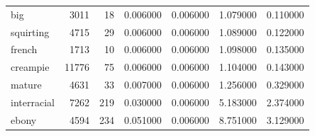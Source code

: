 \begin{tabular}{lrrrrrr}
big & 3011 & 18 & 0.006000 & 0.006000 & 1.079000 & 0.110000 \\
squirting & 4715 & 29 & 0.006000 & 0.006000 & 1.089000 & 0.122000 \\
french & 1713 & 10 & 0.006000 & 0.006000 & 1.098000 & 0.135000 \\
creampie & 11776 & 75 & 0.006000 & 0.006000 & 1.104000 & 0.143000 \\
mature & 4631 & 33 & 0.007000 & 0.006000 & 1.256000 & 0.329000 \\
interracial & 7262 & 219 & 0.030000 & 0.006000 & 5.183000 & 2.374000 \\
ebony & 4594 & 234 & 0.051000 & 0.006000 & 8.751000 & 3.129000 \\
\bottomrule
\end{tabular}
